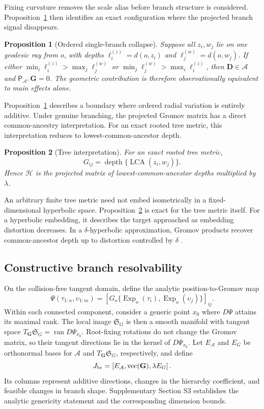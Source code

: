 \documentclass[
  12pt]{article}
\newtheorem{proposition}{Proposition}[section]
\theoremstyle{definition}
\theoremstyle{plain}
\newcommand{\calA}{\mathcal A}
\newcommand{\projA}{\mathsf P_{\calA^\perp}}
\newcommand{\bD}{\mathbf D}
\newcommand{\bG}{\mathbf G}
\DeclareMathOperator{\Exp}{Exp}
\DeclareMathOperator{\LCA}{LCA}
\begin{document}
Fixing curvature removes the scale alias before branch structure is considered. Proposition~\ref{prop:collapse} then identifies an exact configuration where the projected branch signal disappears.

\begin{proposition}[Ordered single-branch collapse]
\label{prop:collapse}
Suppose all $z_i,w_j$ lie on one geodesic ray from $o$, with depths $\ell_i^{(z)}=d(o,z_i)$ and $\ell_j^{(w)}=d(o,w_j)$. If either $\min_i \ell_i^{(z)}>\max_j \ell_j^{(w)}$ or $\min_j \ell_j^{(w)}>\max_i \ell_i^{(z)}$, then $\bD\in\calA$ and $\projA\bG=0$. The geometric contribution is therefore observationally equivalent to main effects alone.
\end{proposition}


Proposition~\ref{prop:collapse} describes a boundary where ordered radial variation is entirely additive. Under genuine branching, the projected Gromov matrix has a direct common-ancestry interpretation. For an exact rooted tree metric, this interpretation reduces to lowest-common-ancestor depth.

\begin{proposition}[Tree interpretation]
\label{prop:lca}
For an exact rooted tree metric,
\[
G_{ij}=\operatorname{depth}\{\LCA(z_i,w_j)\}.
\]
Hence $\mathcal H$ is the projected matrix of lowest-common-ancestor depths multiplied by $\lambda$.
\end{proposition}


An arbitrary finite tree metric need not embed isometrically in a fixed-dimensional hyperbolic space. Proposition~\ref{prop:lca} is exact for the tree metric itself. For a hyperbolic embedding, it describes the target approached as embedding distortion decreases. In a $\delta$-hyperbolic approximation, Gromov products recover common-ancestor depth up to distortion controlled by $\delta$ \citep{bridson_1999_MetricSpacesNonpositive}.


\subsection{Constructive branch resolvability}

On the collision-free tangent domain, define the analytic position-to-Gromov map
\[
\Psi(\tau_{1:n},\upsilon_{1:m})=
\left[G_o\{\Exp_o(\tau_i),\Exp_o(\upsilon_j)\}\right]_{ij}.
\]
Within each connected component, consider a generic point $x_0$ where $D\Psi$ attains its maximal rank. The local image $\mathfrak S_G$ is then a smooth manifold with tangent space $T_{\bG}\mathfrak S_G=\operatorname{ran}D\Psi_{x_0}$. Root-fixing rotations do not change the Gromov matrix, so their tangent directions lie in the kernel of $D\Psi_{x_0}$. Let $E_{\calA}$ and $E_G$ be orthonormal bases for $\calA$ and $T_{\bG}\mathfrak S_G$, respectively, and define
\[
J_{\rm br}=\left[E_{\calA},\operatorname{vec}(\bG),\lambda E_G\right].
\]
Its columns represent additive directions, changes in the hierarchy coefficient, and feasible changes in branch shape. Supplementary Section S3 establishes the analytic genericity statement and the corresponding dimension bounds.
\end{document}
